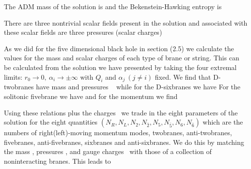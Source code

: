 The ADM mass of the solution is
\eqn{}
and the Bekenstein-Hawking entropy is
\eqn{}

There are three nontrivial scalar fields present
in the solution and
associated with these scalar fields
are three pressures (scalar charges)
\eqn{}

As we did for the five dimensional black hole in
section (2.5) we calculate the
values for the mass and scalar charges
of each type of brane or string.
This can be calculated from the solution we have presented by
taking the four extremal limits: $r_0 \rightarrow 0, ~
\alpha_i \rightarrow 
\pm \infty$ with $Q_i$ and $\alpha_j \ (j\ne i)$ fixed.
We find that D-twobranes have mass and pressures \hlm\
\eqn{}
while for the D-sixbranes we have
\eqn{}
For the solitonic fivebrane we have
\eqn{}
and for the momentum we find
\eqn{}

Using these relations plus the charges  \charges\  we
trade in the eight parameters of the
solution for the eight quantities $(N_R, N_L,
N_2,  N_{\bar 2}, N_5,  N_{\bar 5}, N_6,  N_{\bar 6})$
which are the numbers of
right(left)-moving momentum
modes, twobranes, anti-twobranes, fivebranes,
anti-fivebranes, sixbranes and anti-sixbranes.
We do this by matching the mass \admmass ,
pressures \scharge ,
and gauge charges \charges\ with those of a collection of
noninteracting branes. This leads to
\eqn{}

